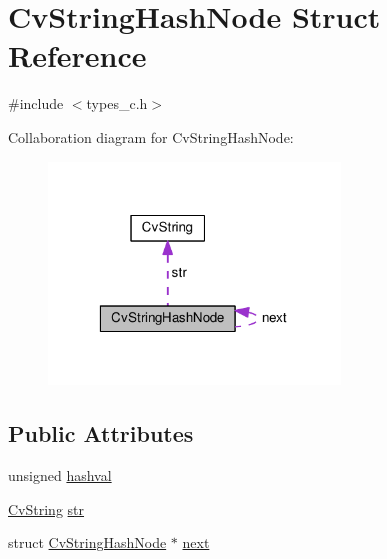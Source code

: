 \hypertarget{structCvStringHashNode}{\section{Cv\-String\-Hash\-Node Struct Reference}
\label{structCvStringHashNode}
}


{\ttfamily \#include $<$types\-\_\-c.\-h$>$}



Collaboration diagram for Cv\-String\-Hash\-Node\-:\nopagebreak
\begin{figure}[H]
\begin{center}
\leavevmode
\includegraphics[width=220pt]{structCvStringHashNode__coll__graph}
\end{center}
\end{figure}
\subsection*{Public Attributes}
\begin{DoxyCompactItemize}
\item 
unsigned \hyperlink{structCvStringHashNode_a42eee0cb707f85886ea2efdf8dab63e5}{hashval}
\item 
\hyperlink{structCvString}{Cv\-String} \hyperlink{structCvStringHashNode_ac33a4cfdba891984b035c1c577525e6d}{str}
\item 
struct \hyperlink{structCvStringHashNode}{Cv\-String\-Hash\-Node} $\ast$ \hyperlink{structCvStringHashNode_a32cae37b1553f1d8cd9f40b894c368ac}{next}
\end{DoxyCompactItemize}


